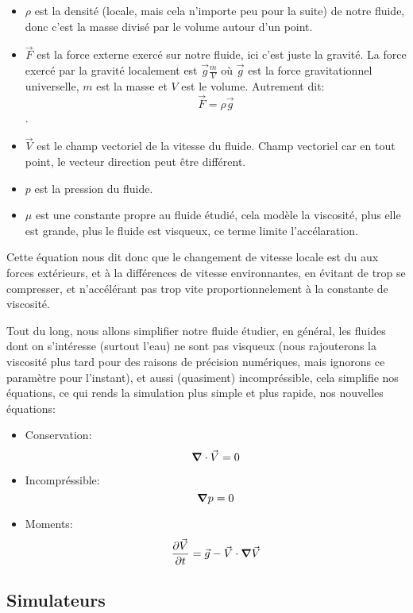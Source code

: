 \documentclass{article}
\begin{document}
\begin{itemize}
    \item \(\rho\) est la densité (locale, mais cela n'importe peu pour la suite) de notre fluide, donc c'est la masse divisé par le volume autour d'un point.
    \item \(\vec{F}\) est la force externe exercé sur notre fluide, ici c'est juste la gravité. La force exercé par la gravité localement est \(\vec{g} \frac{m}{V}\) où \(\vec{g}\) est la force gravitationnel universelle, \(m\) est la masse et \(V\) est le volume. Autrement dit: 
        \[\vec{F} = \rho\vec{g}\].
    \item \(\vec{V}\) est le champ vectoriel de la vitesse du fluide. Champ vectoriel car en tout point, le vecteur direction peut être différent.
    \item \(p\) est la pression du fluide.
    \item \(\mu\) est une constante propre au fluide étudié, cela modèle la viscosité, plus elle est grande, plus le fluide est visqueux, ce terme limite l'accélaration.
\end{itemize}

Cette équation nous dit donc que le changement de vitesse locale est du aux forces extérieurs, et à la différences de vitesse environnantes, en évitant de trop se compresser, et n'accélérant pas trop vite proportionnelement à la constante de viscosité.

Tout du long, nous allons simplifier notre fluide étudier, en général, les fluides dont on s'intéresse (surtout l'eau) ne sont pas visqueux (nous rajouterons la viscosité plus tard pour des raisons de précision numériques, mais ignorons ce paramètre pour l'instant), et aussi (quasiment) incompréssible, cela simplifie nos équations, ce qui rends la simulation plus simple et plus rapide, nos nouvelles équations:

\begin{itemize}
    \item Conservation:
        \[
            \grad \cdot \vec{V} = 0
        \]
    \item Incompréssible:
        \[
            \grad p = 0
        \]
    \item Moments:
        \[
            \pdv{\vec{V}}{t} = \vec{g} - \vec{V} \cdot \grad \vec{V}
        \]
\end{itemize}

\subsection{Simulateurs}
\end{document}
